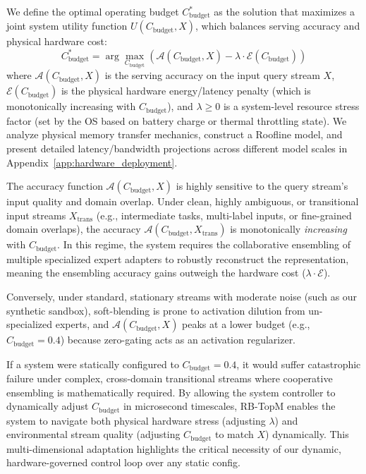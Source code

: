 We define the optimal operating budget $C_{\text{budget}}^*$ as the solution that maximizes a joint system utility function $U(C_{\text{budget}}, X)$, which balances serving accuracy and physical hardware cost:
\begin{equation}
C_{\text{budget}}^* = \arg\max_{C_{\text{budget}}} \left( \mathcal{A}(C_{\text{budget}}, X) - \lambda \cdot \mathcal{E}(C_{\text{budget}}) \right)
\label{eq:utility}
\end{equation}
where $\mathcal{A}(C_{\text{budget}}, X)$ is the serving accuracy on the input query stream $X$, $\mathcal{E}(C_{\text{budget}})$ is the physical hardware energy/latency penalty (which is monotonically increasing with $C_{\text{budget}}$), and $\lambda \ge 0$ is a system-level resource stress factor (set by the OS based on battery charge or thermal throttling state). We analyze physical memory transfer mechanics, construct a Roofline model, and present detailed latency/bandwidth projections across different model scales in Appendix~\ref{app:hardware_deployment}.

The accuracy function $\mathcal{A}(C_{\text{budget}}, X)$ is highly sensitive to the query stream's input quality and domain overlap. Under clean, highly ambiguous, or transitional input streams $X_{\text{trans}}$ (e.g., intermediate tasks, multi-label inputs, or fine-grained domain overlaps), the accuracy $\mathcal{A}(C_{\text{budget}}, X_{\text{trans}})$ is monotonically \emph{increasing} with $C_{\text{budget}}$. In this regime, the system requires the collaborative ensembling of multiple specialized expert adapters to robustly reconstruct the representation, meaning the ensembling accuracy gains outweigh the hardware cost ($\lambda \cdot \mathcal{E}$). 

Conversely, under standard, stationary streams with moderate noise (such as our synthetic sandbox), soft-blending is prone to activation dilution from un-specialized experts, and $\mathcal{A}(C_{\text{budget}}, X)$ peaks at a lower budget (e.g., $C_{\text{budget}} = 0.4$) because zero-gating acts as an activation regularizer. 

If a system were statically configured to $C_{\text{budget}} = 0.4$, it would suffer catastrophic failure under complex, cross-domain transitional streams where cooperative ensembling is mathematically required. By allowing the system controller to dynamically adjust $C_{\text{budget}}$ in microsecond timescales, RB-TopM enables the system to navigate both physical hardware stress (adjusting $\lambda$) and environmental stream quality (adjusting $C_{\text{budget}}$ to match $X$) dynamically. This multi-dimensional adaptation highlights the critical necessity of our dynamic, hardware-governed control loop over any static config.

